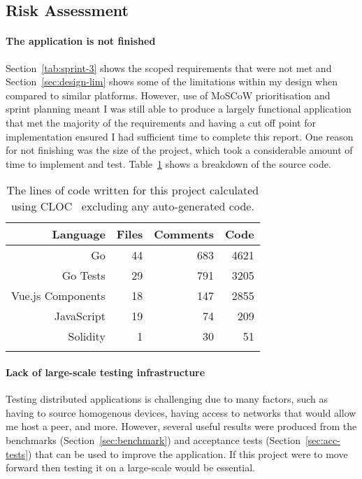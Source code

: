 \subsection*{Risk Assessment}\label{subsec:risk-reflection}

\paragraph*{The application is not finished}
Section~\ref{tab:sprint-3} shows the scoped requirements that were not met and Section~\ref{sec:design-lim} shows some of the limitations within my design when compared to similar platforms. However, use of MoSCoW prioritisation and sprint planning meant I was still able to produce a largely functional application that met the majority of the requirements and having a cut off point for implementation ensured I had sufficient time to complete this report.
\x
One reason for not finishing was the size of the project, which took a considerable amount of time to implement and test. Table~\ref{tab:cloc} shows a breakdown of the source code.

\begin{longtable}{ r r r r }
  \toprule
  \textbf{Language} & \textbf{Files} & \textbf{Comments} & \textbf{Code}
  \\\midrule\midrule
  Go
  & 44
  & 683
  & 4621
  \\
  Go Tests
  & 29
  & 791
  & 3205
  \\
  Vue.js Components
  & 18
  & 147
  & 2855
  \\
  JavaScript
  & 19
  & 74
  & 209
  \\
  Solidity
  & 1
  & 30
  & 51
  \\\bottomrule\bottomrule
  \caption{The lines of code written for this project calculated using CLOC~\cite{noauthor_aldanialcloc_nodate} excluding any auto-generated code.}
  \label{tab:cloc}
\end{longtable}

\paragraph*{Lack of large-scale testing infrastructure}
Testing distributed applications is challenging due to many factors, such as having to source homogenous devices, having access to networks that would allow me host a peer, and more. However, several useful results were produced from the benchmarks (Section~\ref{sec:benchmark}) and acceptance tests (Section~\ref{sec:acc-tests}) that can be used to improve the application. If this project were to move forward then testing it on a large-scale would be essential.